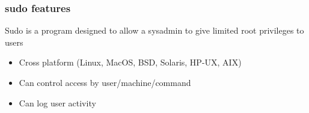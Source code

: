 \begin{frame}[fragile]
	\frametitle{sudo features}
	Sudo is a program designed to allow a sysadmin to give limited root privileges
to users
  \begin{itemize}
	  \item Cross platform (Linux, MacOS, BSD, Solaris, HP-UX, AIX)
	  \item Can control access by user/machine/command 
	  \item Can log user activity
  \end{itemize} 

\end{frame}
